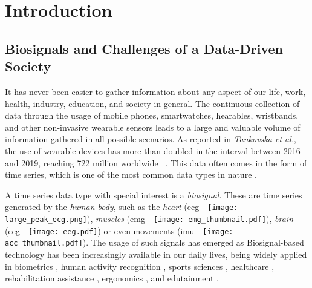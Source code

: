 
%

\chapter{Introduction}
\label{cha:introduction}



\section{Biosignals and Challenges of a Data-Driven Society} 
\label{sub:motivation1}


It has never been easier to gather information about any aspect of our life, work, health, industry, education, and society in general. The continuous collection of data through the usage of mobile phones, smartwatches, hearables, wristbands, and other non-invasive wearable sensors leads to a large and valuable volume of information gathered in all possible scenarios. As reported in \textit{Tankovska et al.}, the use of wearable devices has more than doubled in the interval between 2016 and 2019, reaching 722 million worldwide ~\cite{tankovska_23_2020}. This data often comes in the form of time series, which is one of the most common data types in nature \cite{puttinghuman}.

A time series data type with special interest is a \textit{biosignal}. These are time series generated by the \textit{human body}, such as the \textit{heart} (\gls{ecg} - \texttt{[image: large\_peak\_ecg.png]}), \textit{muscles} (\gls{emg} - \texttt{[image: emg\_thumbnail.pdf]}), \textit{brain} (\gls{eeg} - \texttt{[image: eeg.pdf]}) or even movements (\gls{imu} - \texttt{[image: acc\_thumbnail.pdf]}). The usage of such signals has emerged as Biosignal-based technology has been increasingly available in our daily lives, being widely applied in biometrics \cite{david_thesis}, human activity recognition \cite{cpd_har_1, cpd_har_2, review_1}, sports sciences \cite{li20gait, liu22activityduration, mendes2016sensor, ji2018real, howard2016survey, mcnab2011iphone, howard2016wireless, yuji2005mems, espinosa2015inertial, ohgi2002microcomputer}, healthcare \cite{cpd_medical_1, cpd_medical_2, cpd_medical_3, cpd_medical_4, dataset6, dataset7}, rehabilitation assistance \cite{rehab1, rehab2}, ergonomics \cite{antonio, sara}, and edutainment \cite{edutainment}.


